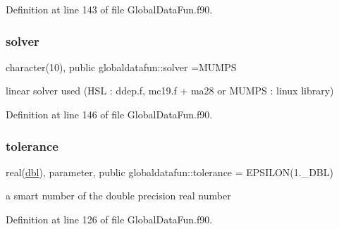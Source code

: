 Definition at line 143 of file Global\+Data\+Fun.\+f90.

\mbox{\label{namespaceglobaldatafun_a895a1e10c59021323fcf518893f6c0de}} 
\subsubsection{\texorpdfstring{solver}{solver}}
{\footnotesize\ttfamily character(10), public globaldatafun\+::solver =\textquotesingle{}M\+U\+M\+PS\textquotesingle{}}



linear solver used (H\+SL \+: ddep.\+f, mc19.\+f + ma28 or M\+U\+M\+PS \+: linux library) 



Definition at line 146 of file Global\+Data\+Fun.\+f90.

\mbox{\label{namespaceglobaldatafun_a163afcd0caf3537efef266782e451784}} 
\subsubsection{\texorpdfstring{tolerance}{tolerance}}
{\footnotesize\ttfamily real(\hyperlink{namespaceglobaldatafun_a5008801201dd34f2af8eae07756befb4}{dbl}), parameter, public globaldatafun\+::tolerance = E\+P\+S\+I\+L\+ON(1.\+\_\+\+D\+B\+L)}



a smart number of the double precision real number 



Definition at line 126 of file Global\+Data\+Fun.\+f90.

